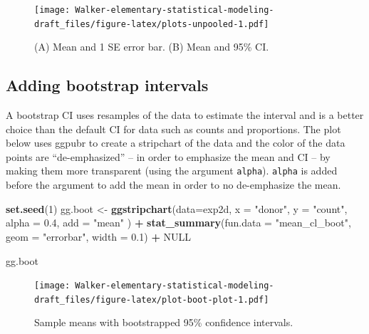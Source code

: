 \documentclass[]{book}
\newenvironment{Shaded}{\begin{snugshade}}{\end{snugshade}}
\newcommand{\DataTypeTok}[1]{\textcolor[rgb]{0.13,0.29,0.53}{#1}}
\newcommand{\DecValTok}[1]{\textcolor[rgb]{0.00,0.00,0.81}{#1}}
\newcommand{\FloatTok}[1]{\textcolor[rgb]{0.00,0.00,0.81}{#1}}
\newcommand{\KeywordTok}[1]{\textcolor[rgb]{0.13,0.29,0.53}{\textbf{#1}}}
\newcommand{\NormalTok}[1]{#1}
\newcommand{\OperatorTok}[1]{\textcolor[rgb]{0.81,0.36,0.00}{\textbf{#1}}}
\newcommand{\OtherTok}[1]{\textcolor[rgb]{0.56,0.35,0.01}{#1}}
\newcommand{\StringTok}[1]{\textcolor[rgb]{0.31,0.60,0.02}{#1}}
\begin{document}
\begin{figure}
\centering
\texttt{[image: Walker-elementary-statistical-modeling-draft\_files/figure-latex/plots-unpooled-1.pdf]}
\caption{\label{fig:plots-unpooled}(A) Mean and 1 SE error bar. (B) Mean and 95\% CI.}
\end{figure}

\hypertarget{adding-bootstrap-intervals}{%
\subsection{Adding bootstrap intervals}\label{adding-bootstrap-intervals}}

A bootstrap CI uses resamples of the data to estimate the interval and is a better choice than the default CI for data such as counts and proportions. The plot below uses ggpubr to create a stripchart of the data and the color of the data points are ``de-emphasized'' -- in order to emphasize the mean and CI -- by making them more transparent (using the argument \texttt{alpha}). \texttt{alpha} is added before the argument to add the mean in order to no de-emphasize the mean.

\begin{Shaded}
\begin{Highlighting}[]
\KeywordTok{set.seed}\NormalTok{(}\DecValTok{1}\NormalTok{)}
\NormalTok{gg.boot <-}\StringTok{ }\KeywordTok{ggstripchart}\NormalTok{(}\DataTypeTok{data=}\NormalTok{exp2d,}
                   \DataTypeTok{x =} \StringTok{"donor"}\NormalTok{, }
                   \DataTypeTok{y =} \StringTok{"count"}\NormalTok{, }
                   \DataTypeTok{alpha =} \FloatTok{0.4}\NormalTok{,}
                   \DataTypeTok{add =} \StringTok{"mean"}
\NormalTok{) }\OperatorTok{+}\StringTok{ }
\StringTok{  }\KeywordTok{stat_summary}\NormalTok{(}\DataTypeTok{fun.data =} \StringTok{"mean_cl_boot"}\NormalTok{, }
               \DataTypeTok{geom =} \StringTok{"errorbar"}\NormalTok{, }
               \DataTypeTok{width =} \FloatTok{0.1}\NormalTok{) }\OperatorTok{+}
\StringTok{  }\OtherTok{NULL}


\NormalTok{gg.boot}
\end{Highlighting}
\end{Shaded}

\begin{figure}
\centering
\texttt{[image: Walker-elementary-statistical-modeling-draft\_files/figure-latex/plot-boot-plot-1.pdf]}
\caption{\label{fig:plot-boot-plot}Sample means with bootstrapped 95\% confidence intervals.}
\end{figure}
\end{document}
